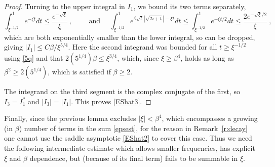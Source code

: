 \documentclass[10pt]{article}
\newcommand{\freq}{\beta}          %
\begin{document}
\begin{proof}
  Turning to the upper integral in $I_1$, we bound its two terms
  separately, 
  $$
  \int_{\xi^{-1/2}}^1 e^{-\xi t}  dt \le \frac{e^{-\sqrt{\xi}}}{\xi}~,
  \qquad\mbox{ and } \quad
  \int_{\xi^{-1/2}}^1 e^{\freq \sqrt{t}\, |\sqrt{2i + t}| - \xi t} dt
  \le
  \int_{\xi^{-1/2}}^1 e^{-\xi t/2}  dt \le \frac{2e^{-\sqrt{\xi}/2}}{\xi}~,
  $$
  which are both exponentially smaller than the lower integral,
  so can be dropped, giving $|I_1| \le C\freq/\xi^{5/4}$.
  Here the second integrand was bounded for all $t \ge \xi^{-1/2}$ using
  \eqref{5q} and that $2(5^{1/4}) \freq \le \xi^{3/4}$,
  which, since $\xi\ge\freq^4$, holds as long as
  $\freq^2 \ge 2(5^{1/4})$, which is satisfied if $\freq\ge 2$.
  
  The integrand on the third segment is the complex conjugate of the first,
  so $I_3 = I_1^\ast$ and $|I_3| = |I_1|$. This proves \eqref{EShat3}.
\end{proof}

Finally, since the previous lemma excludes $|\xi|<\beta^4$,
which encompasses a growing (in $\freq$) number of terms in the sum
\eqref{epsest}, for the reason in Remark~\ref{r:decay}
one cannot use the saddle asymptotic \eqref{EShat2} to cover this case.
Thus we need the following intermediate
estimate which allows smaller frequencies,
has explicit $\xi$ and $\freq$ dependence,
but (because of its final term) fails to be summable in $\xi$.
\end{document}
